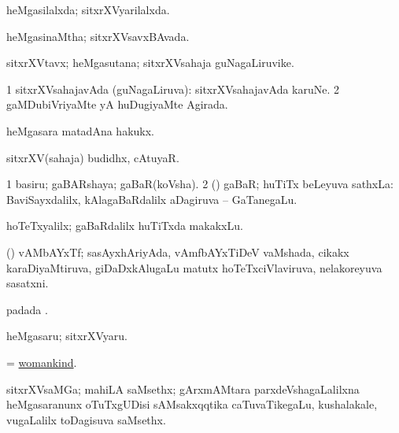 \bentry
{} 
\gl{\gu}
\expl{}
\bmng
heMgasilalxda; sitxrXVyarilalxda. 
\emng
\eentry

\bentry
{} 
\gl{\gu}
\expl{}
\bmng
heMgasinaMtha; sitxrXVsavxBAvada. 
\emng
\eentry

\bentry
{} 
\gl{\nA}
\expl{}
\bmng
sitxrXVtavx; heMgasutana; sitxrXVsahaja guNagaLiruvike. 
\emng
\eentry

\bentry
{} 
\gl{\gu}
\expl{}
\bmng
\bnum
\num{1} sitxrXVsahajavAda (guNagaLiruva):  sitxrXVsahajavAda karuNe. 
\num{2} gaMDubiVriyaMte yA huDugiyaMte Agirada. 
\enum
\emng
\eentry

\bentry
{} 
\gl{\nA}
\expl{}
\bmng
heMgasara matadAna hakukx. 
\emng
\eentry

\bentry
{} 
\gl{\nA}
\expl{}
\bmng
sitxrXV(sahaja) budidhx, cAtuyaR. 
\emng
\eentry

\bentry
{} 
\gl{\nA}
\bmng
\bnum
\num{1} basiru; gaBARshaya; gaBaR(koVsha). 
\num{2} (\rUpa) gaBaR; huTiTx beLeyuva sathxLa:  BaviSayxdalilx, kAlagaBaRdalilx aDagiruva -- GaTanegaLu. 
\enum
\emng

\noindent
\gl{\pagu}
\expl{}
\bmng
{} hoTeTxyalilx; gaBaRdalilx huTiTxda makakxLu. 
\emng
\eentry

\bentry
{} 
\gl{\nA}
\expl{}
\bmng
(\AseTxrXV) vAMbAYxTf; sasAyxhAriyAda, vAmfbAYxTiDeV vaMshada, cikakx karaDiyaMtiruva, giDaDxkAlugaLu matutx hoTeTxciVlaviruva, nelakoreyuva sasatxni. 
\emng
\eentry

\bentry
{} 
\gl{\nA}
\expl{}
\bmng
{} padada \bava. 
\emng
\eentry

\bentry
{} 
\gl{\nA}
\expl{}
\bmng
heMgasaru; sitxrXVyaru. 
\emng
\eentry

\bentry
{} 
\gl{\nA}
\expl{}
\bmng
= \hyperlink{womankind}{womankind}. 
\emng
\eentry

\bentry
{} 
\gl{\nA}
\expl{}
\bmng
sitxrXVsaMGa; mahiLA saMsethx; gArxmAMtara parxdeVshagaLalilxna heMgasaranunx oTuTxgUDisi sAMsakxqqtika caTuvaTikegaLu, kushalakale, \mo vugaLalilx toDagisuva saMsethx. 
\emng
\eentry

